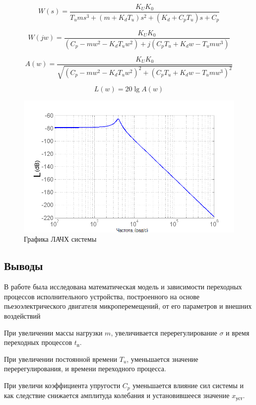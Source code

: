 \documentclass[a4paper, 12pt]{article}
\begin{document}
\begin{equation}
W(s) = \frac{{{K_U}{K_0}}}{{{T_u}m{s^3} + (m + {K_d}{T_u}){s^2} + ({K_d} + {C_p}{T_u})s + {C_p}}}
\end{equation}

\begin{equation}
W(jw) = \frac{{{K_U}{K_0}}}{{({C_p} - m{w^2} - {K_d}{T_u}{w^2}) + j({C_p}{T_u} + {K_d}w - {T_u}m{w^3})}}
\end{equation}

\begin{equation}
A(w) = \frac{{{K_U}{K_0}}}{{\sqrt {{{({C_p} - m{w^2} - {K_d}{T_u}{w^2})}^2} + {{({C_p}{T_u} + {K_d}w - {T_u}m{w^3})}^2}} }}
\end{equation}

\begin{equation}
L(w) = 20\lg A(w)
\end{equation}

\begin{figure}[h]
	\centering
	\includegraphics[width=0.7\linewidth]{10}
	\caption{Графика ЛАЧХ системы}
	\label{}
\end{figure}
\newpage
\begin{center}
	\section*{Выводы}
\end{center}\par

В работе была исследована математическая модель и зависимости переходных процессов исполнительного устройства, построенного на основе пьезоэлектрического двигателя микроперемещений, от его параметров и внешних воздействий\par
При увеличении массы нагрузки $m$, увеличивается перерегулирование $\sigma$ и время переходных процессов $t_\text{п}$. \par
При увеличении постоянной времени $T_u$, уменьшается значение перерегулирования, и времени переходного процесса. \par
При увеличи коэффициента упругости $C_p$ уменьшается влияние сил системы и как следствие снижается амплитуда колебания и установившееся значение $x_\text{уст}$.
\end{document}
